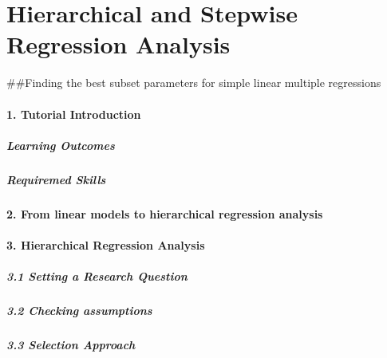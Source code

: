 \documentclass[
]{article}
\author{}
\date{\vspace{-2.5em}}
\begin{document}
\hypertarget{hierarchical-and-stepwise-regression-analysis}{%
\section{Hierarchical and Stepwise Regression
Analysis}\label{hierarchical-and-stepwise-regression-analysis}}

\#\#Finding the best subset parameters for simple linear multiple
regressions

\hypertarget{tutorial-introduction}{%
\paragraph{\texorpdfstring{ 1. Tutorial Introduction
}{ 1. Tutorial Introduction }}\label{tutorial-introduction}}

\hypertarget{learning-outcomes}{%
\subparagraph{\texorpdfstring{ Learning Outcomes
}{ Learning Outcomes }}\label{learning-outcomes}}

\hypertarget{requiremed-skills}{%
\subparagraph{\texorpdfstring{ Requiremed Skills
}{ Requiremed Skills }}\label{requiremed-skills}}

\hypertarget{from-linear-models-to-hierarchical-regression-analysis}{%
\paragraph{\texorpdfstring{ 2. From linear models to hierarchical
regression analysis
}{ 2. From linear models to hierarchical regression analysis }}\label{from-linear-models-to-hierarchical-regression-analysis}}

\hypertarget{hierarchical-regression-analysis}{%
\paragraph{\texorpdfstring{ 3. Hierarchical Regression Analysis
}{ 3. Hierarchical Regression Analysis }}\label{hierarchical-regression-analysis}}

\hypertarget{setting-a-research-question}{%
\subparagraph{\texorpdfstring{ 3.1 Setting a Research Question
}{ 3.1 Setting a Research Question }}\label{setting-a-research-question}}

\hypertarget{checking-assumptions}{%
\subparagraph{\texorpdfstring{ 3.2 Checking assumptions
}{ 3.2 Checking assumptions }}\label{checking-assumptions}}

\hypertarget{selection-approach}{%
\subparagraph{\texorpdfstring{ 3.3 Selection Approach
}{ 3.3 Selection Approach }}\label{selection-approach}}
\end{document}
